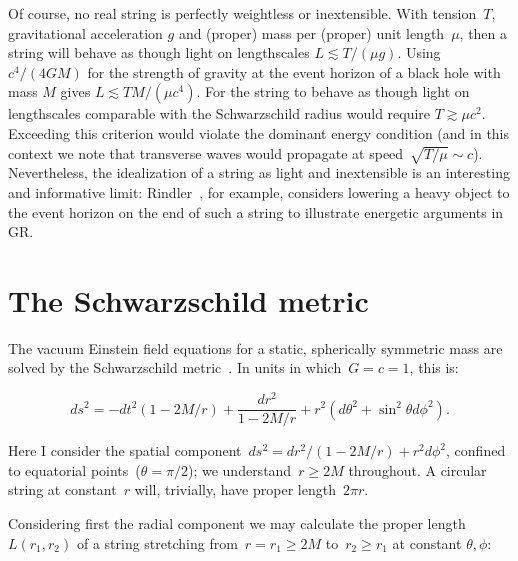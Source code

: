 \documentclass[review]{elsarticle}
\begin{document}
Of course, no real string is perfectly weightless or inextensible.
With tension~$T$, gravitational acceleration $g$ and (proper) mass per
(proper) unit length~$\mu$, then a string will behave as though light
on lengthscales $L\lesssim T/\left(\mu g\right)$.  Using
$c^4/\left(4GM\right)$ for the strength of gravity at the event
horizon of a black hole with mass $M$ gives $L\lesssim TM/\left(\mu
c^4\right)$.  For the string to behave as though light on lengthscales
comparable with the Schwarzschild radius would require $T\gtrsim\mu
c^2$.  Exceeding this criterion would violate the dominant energy
condition (and in this context we note that transverse waves would
propagate at speed~$\sqrt{T/\mu}\sim c$).  Nevertheless, the
idealization of a string as light and inextensible is an interesting
and informative limit: Rindler~\cite{rindler}, for example, considers
lowering a heavy object to the event horizon on the end of such a
string to illustrate energetic arguments in GR.

\section{The Schwarzschild metric}

The vacuum Einstein field equations for a static, spherically
symmetric mass are solved by the Schwarzschild
metric~\cite{schwarzschild1916}.  In units in which~$G=c=1$, this is:

\begin{equation}\label{schwarzschild}
ds^2= -dt^2\left(1-2M/r\right) +\frac{dr^2}{1-2M/r} + r^2\left(d\theta^2 + \sin^2\theta d\phi^2\right).
\end{equation}

\noindent Here I consider the spatial component~$ds^2=
dr^2/\left(1-2M/r\right) + r^2d\phi^2$, confined to equatorial
points~($\theta=\pi/2$); we understand~$r\geqslant 2M$ throughout.  A
circular string at constant~$r$ will, trivially, have proper
length~$2\pi r$.

Considering first the radial component we may calculate the
proper length $L\left(r_1,r_2\right)$ of a string stretching
from~$r=r_1\geqslant 2M$ to~$r_2\geqslant r_1$ at constant $\theta,\phi$:

\end{document}
